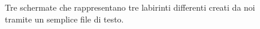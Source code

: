 \documentclass[12pt,a4paper]{report}
\begin{document}
\begin{figure}[hb!]
\begin{subfigure}{.32\textwidth}
  \caption{}
  \label{fig:snap3}
\end{subfigure}
\caption{Tre schermate che rappresentano tre labirinti differenti creati da noi tramite un semplice file di testo.}
\label{fig:fig}
\end{figure}






\end{document}

